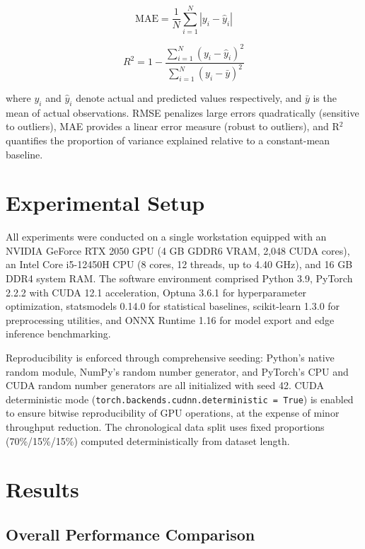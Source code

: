 \documentclass[conference]{IEEEtran}
\begin{document}
\begin{equation}
\text{MAE} = \frac{1}{N}\sum_{i=1}^{N}|y_i - \hat{y}_i|
\label{eq:mae}
\end{equation}

\begin{equation}
R^{2} = 1 - \frac{\sum_{i=1}^{N}(y_i - \hat{y}_i)^2}{\sum_{i=1}^{N}(y_i - \bar{y})^2}
\label{eq:r2}
\end{equation}

where $y_i$ and $\hat{y}_i$ denote actual and predicted values respectively, and $\bar{y}$ is the mean of actual observations. RMSE penalizes large errors quadratically (sensitive to outliers), MAE provides a linear error measure (robust to outliers), and R$^{2}$ quantifies the proportion of variance explained relative to a constant-mean baseline.

\section{Experimental Setup}

All experiments were conducted on a single workstation equipped with an NVIDIA GeForce RTX 2050 GPU (4 GB GDDR6 VRAM, 2,048 CUDA cores), an Intel Core i5-12450H CPU (8 cores, 12 threads, up to 4.40 GHz), and 16 GB DDR4 system RAM. The software environment comprised Python 3.9, PyTorch 2.2.2 with CUDA 12.1 acceleration, Optuna 3.6.1 for hyperparameter optimization, statsmodels 0.14.0 for statistical baselines, scikit-learn 1.3.0 for preprocessing utilities, and ONNX Runtime 1.16 for model export and edge inference benchmarking.

Reproducibility is enforced through comprehensive seeding: Python's native random module, NumPy's random number generator, and PyTorch's CPU and CUDA random number generators are all initialized with seed 42. CUDA deterministic mode (\texttt{torch.backends.cudnn.deterministic = True}) is enabled to ensure bitwise reproducibility of GPU operations, at the expense of minor throughput reduction. The chronological data split uses fixed proportions (70\%/15\%/15\%) computed deterministically from dataset length.

\section{Results}

\subsection{Overall Performance Comparison}
\end{document}
